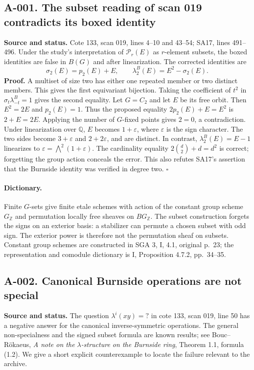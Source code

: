 \documentclass[11pt]{article}
\begin{document}
\subsection*{A-001. The subset reading of scan 019 contradicts its boxed identity}
\textbf{Source and status.} Cote 133, scan 019, lines 4--10 and 43--54;
SA17, lines 491--496.  Under the study's interpretation of $\mathcal P_r(E)$
as $r$-element subsets, the boxed identities are false in $B(G)$ and after
linearization.  The corrected identities are
\[
 \sigma_2(E)=p_2(E)+E,\qquad
 \lambda_2^B(E)=E^2-\sigma_2(E).
\]
\textbf{Proof.} A multiset of size two has either one repeated member or two
distinct members.  This gives the first equivariant bijection.  Taking the
coefficient of $t^2$ in $\sigma_t\lambda^B_{-t}=1$ gives the second equality.
Let $G=C_2$ and let $E$ be its free orbit.  Then $E^2=2E$ and $p_2(E)=1$.
Thus the proposed equality $2p_2(E)+E=E^2$ is $2+E=2E$.  Applying the number
of $G$-fixed points gives $2=0$, a contradiction.  Under linearization over
$\mathbb Q$, $E$ becomes $1+\varepsilon$, where $\varepsilon$ is the sign
character.  The two sides become $3+\varepsilon$ and $2+2\varepsilon$,
and are distinct.  In contrast, $\lambda_2^B(E)=E-1$ linearizes to
$\varepsilon=\bigwedge^2(1+\varepsilon)$.
The cardinality equality $2\binom d2+d=d^2$ is correct; forgetting the group
action conceals the error.  This also refutes SA17's assertion that the
Burnside identity was verified in degree two. \hfill$\square$

\paragraph{Dictionary.}
Finite $G$-sets give finite etale schemes with action of the constant group
scheme $G_{\mathbb Z}$ and permutation locally free sheaves on
$BG_{\mathbb Z}$.  The subset construction forgets the signs on an exterior
basis: a stabilizer can permute a chosen subset with odd sign.  The exterior
power is therefore not the permutation sheaf on subsets.  Constant group
schemes are constructed in SGA 3, I, 4.1, original p.~23; the representation
and comodule dictionary is I, Proposition 4.7.2, pp.~34--35.

\subsection*{A-002. Canonical Burnside operations are not special}
\textbf{Source and status.} The question $\lambda^i(xy)=?$ in cote 133,
scan 019, line 50 has a negative answer for the canonical inverse-symmetric
operations.  The general non-specialness and the signed subset formula are
known results; see Bouc--R\"okaeus, \emph{A note on the $\lambda$-structure on
the Burnside ring}, Theorem 1.1, formula (1.2).  We give a short explicit
counterexample to locate the failure relevant to the archive.
\end{document}
